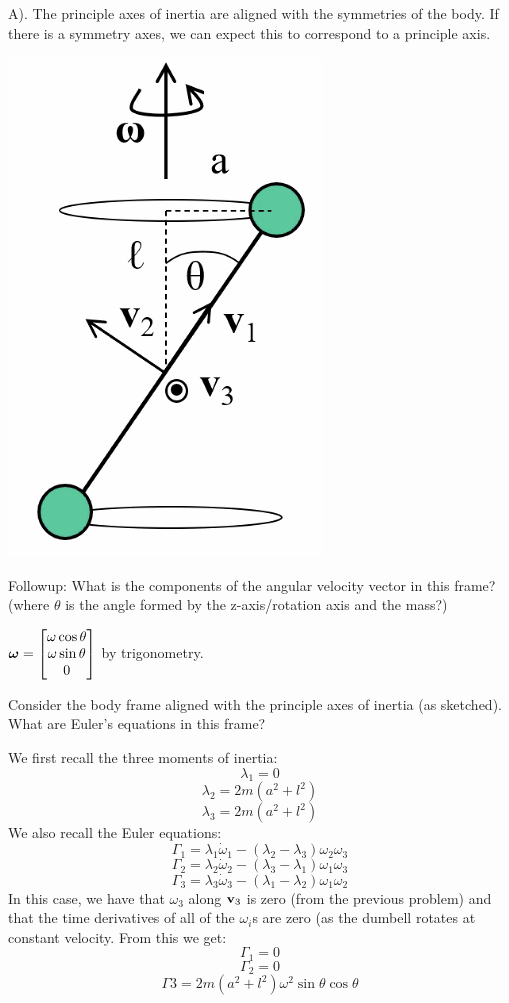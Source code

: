 \documentclass[../PHYS306Notes.tex]{subfiles}
\begin{document}
\begin{s}
A). The principle axes of inertia are aligned with the symmetries of the body. If there is a symmetry axes, we can expect this to correspond to a principle axis.
\end{s}
\begin{center}
    \includegraphics[scale=0.5]{Lecture-20/l20-img3.png}
\end{center}
Followup: What is the components of the angular velocity vector in this frame? (where $\theta$ is the angle formed by the z-axis/rotation axis and the mass?)
\begin{s}
$\bm{\omega} = \begin{bmatrix}\omega\cos\theta \\ \omega\sin\theta \\ 0\end{bmatrix}$ by trigonometry. 
\end{s}
Consider the body frame aligned with the principle axes of inertia (as sketched). What are Euler's equations in this frame?
\begin{s}
We first recall the three moments of inertia:
\[\lambda_1 = 0\]
\[\lambda_2 = 2m(a^2 + l^2)\]
\[\lambda_3 = 2m(a^2 + l^2)\]
We also recall the Euler equations:
\[\Gamma_1 = \lambda_1\dot{\omega}_1 - (\lambda_2 - \lambda_3)\omega_2\omega_3\]
\[\Gamma_2 = \lambda_2\dot{\omega}_2 - (\lambda_3 - \lambda_1)\omega_1\omega_3\]
\[\Gamma_3 = \lambda_3\dot{\omega}_3 - (\lambda_1 - \lambda_2)\omega_1\omega_2\]
In this case, we have that $\omega_3$ along $\mathbf{v}_3$ is zero (from the previous problem) and that the time derivatives of all of the $\omega_i$s are zero (as the dumbell rotates at constant velocity. From this we get:
\[\Gamma_1 = 0\]
\[\Gamma_2 = 0\]
\[\Gamma3 = 2m(a^2 + l^2)\omega^2\sin\theta\cos\theta\]
\end{s}
\end{document}
